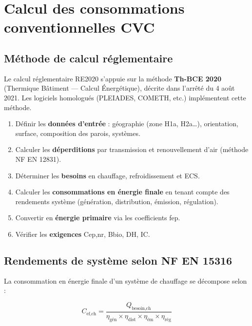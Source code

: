\section{Calcul des consommations conventionnelles CVC}

\subsection{Méthode de calcul réglementaire}

Le calcul réglementaire RE2020 s'appuie sur la méthode \textbf{Th-BCE 2020} (Thermique Bâtiment — Calcul Énergétique), décrite dans l'arrêté du 4 août 2021. Les logiciels homologués (PLEIADES, COMETH, etc.) implémentent cette méthode.

\begin{methode}[title=Démarche de calcul des consommations CVC]
\begin{enumerate}
  \item Définir les \textbf{données d'entrée} : géographie (zone H1a, H2a…), orientation, surface, composition des parois, systèmes.
  \item Calculer les \textbf{déperditions} par transmission et renouvellement d'air (méthode NF EN 12831).
  \item Déterminer les \textbf{besoins} en chauffage, refroidissement et ECS.
  \item Calculer les \textbf{consommations en énergie finale} en tenant compte des rendements système (génération, distribution, émission, régulation).
  \item Convertir en \textbf{énergie primaire} via les coefficients fep.
  \item Vérifier les \textbf{exigences} Cep,nr, Bbio, DH, IC.
\end{enumerate}
\end{methode}

\subsection{Rendements de système selon NF EN 15316}

La consommation en énergie finale d'un système de chauffage se décompose selon :

\begin{equation}
  C_{\text{ef,ch}} = \frac{Q_{\text{besoin,ch}}}{\eta_{\text{gén}} \times \eta_{\text{dist}} \times \eta_{\text{ém}} \times \eta_{\text{rég}}}
  \label{eq:cef_chauffage}
\end{equation}

